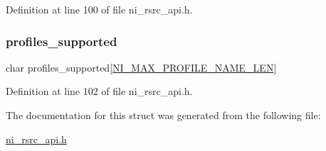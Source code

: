Definition at line 100 of file ni\+\_\+rsrc\+\_\+api.\+h.

\mbox{\label{struct__ni__device__video__capability_aa215f584caac195e37dcc9da3f80e4a4}} 
\subsubsection{\texorpdfstring{profiles\_supported}{profiles\_supported}}
{\footnotesize\ttfamily char profiles\+\_\+supported\mbox{[}\mbox{\hyperlink{ni__rsrc__api_8h_a5a7b5c8942cc01883c392e9497c3a99d}{N\+I\+\_\+\+M\+A\+X\+\_\+\+P\+R\+O\+F\+I\+L\+E\+\_\+\+N\+A\+M\+E\+\_\+\+L\+EN}}\mbox{]}}



Definition at line 102 of file ni\+\_\+rsrc\+\_\+api.\+h.



The documentation for this struct was generated from the following file\+:\begin{DoxyCompactItemize}
\item 
\mbox{\hyperlink{ni__rsrc__api_8h}{ni\+\_\+rsrc\+\_\+api.\+h}}\end{DoxyCompactItemize}
